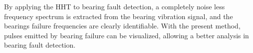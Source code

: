 \documentclass[../Main/thesis.tex]{subfiles}
\begin{document}
 By applying the HHT to bearing fault detection, a completely noise less frequency spectrum is extracted from the bearing vibration signal, and the bearings failure frequencies are clearly identifiable. With the present method, pulses emitted by bearing failure can be visualized, allowing a better analysis in bearing fault detection.

\vfill\vfill
\clearpage
\blankpage
\end{document}
